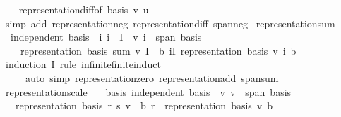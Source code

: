 \begin{isabellebody}
%
\isadelimproof
\ \ %
\endisadelimproof
%
\isatagproof
{}\isamarkupfalse%
\ representation{\isacharunderscore}{\kern0pt}diff{\isacharbrackleft}{\kern0pt}of\ basis\ {\isachardoublequoteopen}{\isacharminus}{\kern0pt}v{\isachardoublequoteclose}\ u{\isacharbrackright}{\kern0pt}\ \isamarkupfalse%
\ {\isacharparenleft}{\kern0pt}simp\ add{\isacharcolon}{\kern0pt}\ representation{\isacharunderscore}{\kern0pt}neg\ representation{\isacharunderscore}{\kern0pt}diff\ span{\isacharunderscore}{\kern0pt}neg{\isacharparenright}{\kern0pt}%
\endisatagproof
{\isafoldproof}%
%
\isadelimproof
\isanewline
%
\endisadelimproof
\isanewline
{}\isamarkupfalse%
\ representation{\isacharunderscore}{\kern0pt}sum{\isacharcolon}{\kern0pt}\isanewline
\ \ {\isachardoublequoteopen}independent\ basis\ {\isasymLongrightarrow}\ {\isacharparenleft}{\kern0pt}{\isasymAnd}i{\isachardot}{\kern0pt}\ i\ {\isasymin}\ I\ {\isasymLongrightarrow}\ v\ i\ {\isasymin}\ span\ basis{\isacharparenright}{\kern0pt}\ {\isasymLongrightarrow}\isanewline
\ \ \ \ representation\ basis\ {\isacharparenleft}{\kern0pt}sum\ v\ I{\isacharparenright}{\kern0pt}\ {\isacharequal}{\kern0pt}\ {\isacharparenleft}{\kern0pt}{\isasymlambda}b{\isachardot}{\kern0pt}\ {\isasymSum}i{\isasymin}I{\isachardot}{\kern0pt}\ representation\ basis\ {\isacharparenleft}{\kern0pt}v\ i{\isacharparenright}{\kern0pt}\ b{\isacharparenright}{\kern0pt}{\isachardoublequoteclose}\isanewline
%
\isadelimproof
\ \ %
\endisadelimproof
%
\isatagproof
{}\isamarkupfalse%
\ {\isacharparenleft}{\kern0pt}induction\ I\ rule{\isacharcolon}{\kern0pt}\ infinite{\isacharunderscore}{\kern0pt}finite{\isacharunderscore}{\kern0pt}induct{\isacharparenright}{\kern0pt}\isanewline
\ \ \ \ \ {\isacharparenleft}{\kern0pt}auto\ simp{\isacharcolon}{\kern0pt}\ representation{\isacharunderscore}{\kern0pt}zero\ representation{\isacharunderscore}{\kern0pt}add\ span{\isacharunderscore}{\kern0pt}sum{\isacharparenright}{\kern0pt}%
\endisatagproof
{\isafoldproof}%
%
\isadelimproof
\isanewline
%
\endisadelimproof
\isanewline
{}\isamarkupfalse%
\ representation{\isacharunderscore}{\kern0pt}scale{\isacharcolon}{\kern0pt}\isanewline
\ \ \ basis{\isacharcolon}{\kern0pt}\ {\isachardoublequoteopen}independent\ basis{\isachardoublequoteclose}\ \ v{\isacharcolon}{\kern0pt}\ {\isachardoublequoteopen}v\ {\isasymin}\ span\ basis{\isachardoublequoteclose}\isanewline
\ \ \ {\isachardoublequoteopen}representation\ basis\ {\isacharparenleft}{\kern0pt}r\ {\isacharasterisk}{\kern0pt}s\ v{\isacharparenright}{\kern0pt}\ {\isacharequal}{\kern0pt}\ {\isacharparenleft}{\kern0pt}{\isasymlambda}b{\isachardot}{\kern0pt}\ r\ {\isacharasterisk}{\kern0pt}\ representation\ basis\ v\ b{\isacharparenright}{\kern0pt}{\isachardoublequoteclose}\isanewline

\end{isabellebody}
